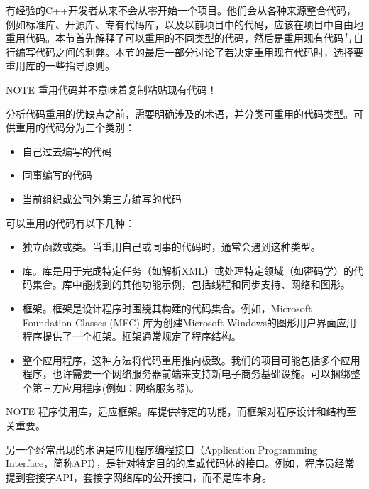 
有经验的C++开发者从来不会从零开始一个项目。他们会从各种来源整合代码，例如标准库、开源库、专有代码库，以及以前项目中的代码，应该在项目中自由地重用代码。本节首先解释了可以重用的不同类型的代码，然后是重用现有代码与自行编写代码之间的利弊。本节的最后一部分讨论了若决定重用现有代码时，选择要重用库的一些指导原则。

\begin{myNotic}{NOTE}
重用代码并不意味着复制粘贴现有代码！
\end{myNotic}


分析代码重用的优缺点之前，需要明确涉及的术语，并分类可重用的代码类型。可供重用的代码分为三个类别：

\begin{itemize}
\item
自己过去编写的代码

\item
同事编写的代码

\item
当前组织或公司外第三方编写的代码
\end{itemize}

可以重用的代码有以下几种：

\begin{itemize}
\item
独立函数或类。当重用自己或同事的代码时，通常会遇到这种类型。

\item
库。库是用于完成特定任务（如解析XML）或处理特定领域（如密码学）的代码集合。库中能找到的其他功能示例，包括线程和同步支持、网络和图形。

\item
框架。框架是设计程序时围绕其构建的代码集合。例如，Microsoft Foundation Classes (MFC) 库为创建Microsoft Windows的图形用户界面应用程序提供了一个框架。框架通常规定了程序结构。

\item
整个应用程序，这种方法将代码重用推向极致。我们的项目可能包括多个应用程序，也许需要一个网络服务器前端来支持新电子商务基础设施。可以捆绑整个第三方应用程序(例如：网络服务器)。
\end{itemize}

\begin{myNotic}{NOTE}
程序使用库，适应框架。库提供特定的功能，而框架对程序设计和结构至关重要。
\end{myNotic}

另一个经常出现的术语是应用程序编程接口（Application Programming Interface，简称API），是针对特定目的的库或代码体的接口。例如，程序员经常提到套接字API，套接字网络库的公开接口，而不是库本身。

